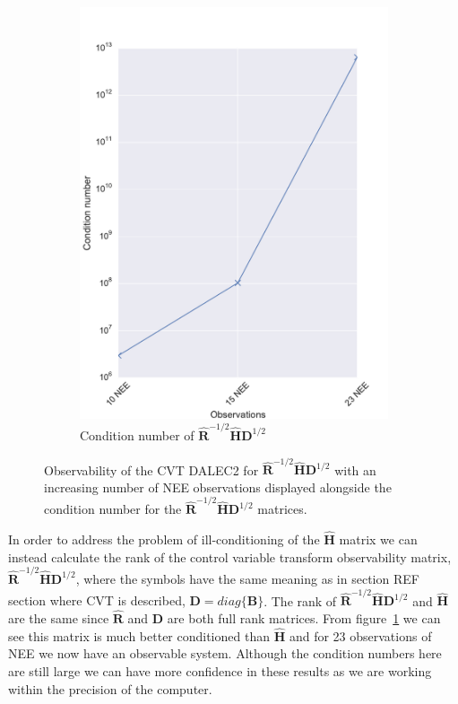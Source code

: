 \documentclass[11pt]{article}
\begin{document}
\begin{figure}[ht]
\begin{subfigure}[b]{0.49\textwidth}
        \includegraphics[width=\textwidth]{dalec2_obsrankcvtcond.pdf}
        \caption{Condition number of $\hat{\textbf{R}}^{-1/2}\hat{\textbf{H}}\textbf{D}^{1/2}$}
        \label{fig:D2_observabilitycondcvt}
    \end{subfigure}
    \caption{Observability of the CVT DALEC2 for $\hat{\textbf{R}}^{-1/2}\hat{\textbf{H}}\textbf{D}^{1/2}$ with an increasing number of NEE observations displayed alongside the condition number for the $\hat{\textbf{R}}^{-1/2}\hat{\textbf{H}}\textbf{D}^{1/2}$ matrices.}
    \label{fig:D2_cvtobservability}
\end{figure}

In order to address the problem of ill-conditioning of the $\hat{\textbf{H}}$ matrix we can instead calculate the rank of the control variable transform observability matrix, $\hat{\textbf{R}}^{-1/2}\hat{\textbf{H}}\textbf{D}^{1/2}$, where the symbols have the same meaning as in section {\color{red} REF section where CVT is described, $\textbf{D} = diag\{\textbf{B}\}$}. The rank of $\hat{\textbf{R}}^{-1/2}\hat{\textbf{H}}\textbf{D}^{1/2}$ and $\hat{\textbf{H}}$ are the same since $\hat{\textbf{R}}$ and $\textbf{D}$ are both full rank matrices. From figure~\ref{fig:D2_observabilitycondcvt} we can see this matrix is much better conditioned than $\hat{\textbf{H}}$ and for 23 observations of NEE we now have an observable system. Although the condition numbers here are still large we can have more confidence in these results as we are working within the precision of the computer.
\end{document}
